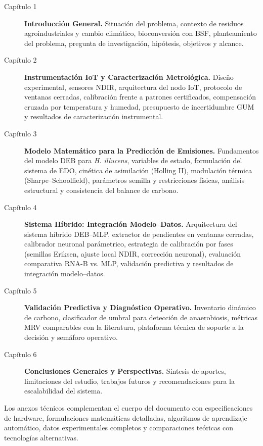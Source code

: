 \begin{description}
    \item[Capítulo 1] \textbf{Introducción General.} Situación del problema, contexto de residuos agroindustriales y cambio climático, bioconversión con BSF, planteamiento del problema, pregunta de investigación, hipótesis, objetivos y alcance.
    
    \item[Capítulo 2] \textbf{Instrumentación IoT y Caracterización Metrológica.} Diseño experimental, sensores NDIR, arquitectura del nodo IoT, protocolo de ventanas cerradas, calibración frente a patrones certificados, compensación cruzada por temperatura y humedad, presupuesto de incertidumbre GUM y resultados de caracterización instrumental.
    
    \item[Capítulo 3] \textbf{Modelo Matemático para la Predicción de Emisiones.} Fundamentos del modelo DEB para \textit{H. illucens}, variables de estado, formulación del sistema de EDO, cinética de asimilación (Holling II), modulación térmica (Sharpe--Schoolfield), parámetros semilla y restricciones físicas, análisis estructural y consistencia del balance de carbono.
    
    \item[Capítulo 4] \textbf{Sistema Híbrido: Integración Modelo--Datos.} Arquitectura del sistema híbrido DEB--MLP, extractor de pendientes en ventanas cerradas, calibrador neuronal parámetrico, estrategia de calibración por fases (semillas Eriksen, ajuste local NDIR, corrección neuronal), evaluación comparativa RNA-B vs. MLP, validación predictiva y resultados de integración modelo--datos.
    
    \item[Capítulo 5] \textbf{Validación Predictiva y Diagnóstico Operativo.} Inventario dinámico de carbono, clasificador de umbral para detección de anaerobiosis, métricas MRV comparables con la literatura, plataforma técnica de soporte a la decisión y semáforo operativo.
    
    \item[Capítulo 6] \textbf{Conclusiones Generales y Perspectivas.} Síntesis de aportes, limitaciones del estudio, trabajos futuros y recomendaciones para la escalabilidad del sistema.
\end{description}

Los anexos técnicos complementan el cuerpo del documento con especificaciones de hardware, formulaciones matemáticas detalladas, algoritmos de aprendizaje automático, datos experimentales completos y comparaciones teóricas con tecnologías alternativas.
